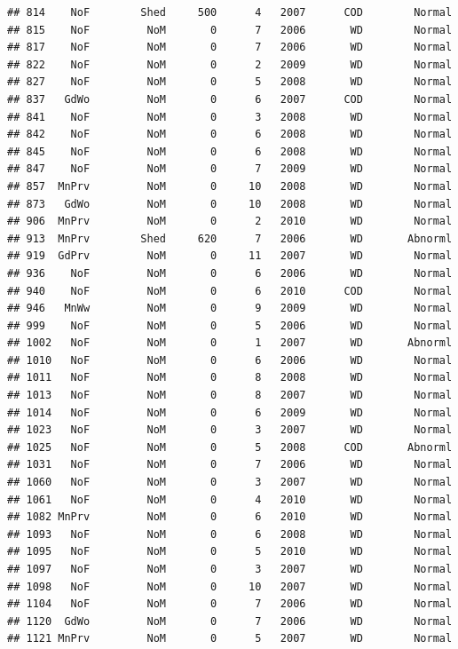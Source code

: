 \documentclass[]{article}
\begin{document}
\begin{verbatim}
## 814    NoF        Shed     500      4   2007      COD        Normal
## 815    NoF         NoM       0      7   2006       WD        Normal
## 817    NoF         NoM       0      7   2006       WD        Normal
## 822    NoF         NoM       0      2   2009       WD        Normal
## 827    NoF         NoM       0      5   2008       WD        Normal
## 837   GdWo         NoM       0      6   2007      COD        Normal
## 841    NoF         NoM       0      3   2008       WD        Normal
## 842    NoF         NoM       0      6   2008       WD        Normal
## 845    NoF         NoM       0      6   2008       WD        Normal
## 847    NoF         NoM       0      7   2009       WD        Normal
## 857  MnPrv         NoM       0     10   2008       WD        Normal
## 873   GdWo         NoM       0     10   2008       WD        Normal
## 906  MnPrv         NoM       0      2   2010       WD        Normal
## 913  MnPrv        Shed     620      7   2006       WD       Abnorml
## 919  GdPrv         NoM       0     11   2007       WD        Normal
## 936    NoF         NoM       0      6   2006       WD        Normal
## 940    NoF         NoM       0      6   2010      COD        Normal
## 946   MnWw         NoM       0      9   2009       WD        Normal
## 999    NoF         NoM       0      5   2006       WD        Normal
## 1002   NoF         NoM       0      1   2007       WD       Abnorml
## 1010   NoF         NoM       0      6   2006       WD        Normal
## 1011   NoF         NoM       0      8   2008       WD        Normal
## 1013   NoF         NoM       0      8   2007       WD        Normal
## 1014   NoF         NoM       0      6   2009       WD        Normal
## 1023   NoF         NoM       0      3   2007       WD        Normal
## 1025   NoF         NoM       0      5   2008      COD       Abnorml
## 1031   NoF         NoM       0      7   2006       WD        Normal
## 1060   NoF         NoM       0      3   2007       WD        Normal
## 1061   NoF         NoM       0      4   2010       WD        Normal
## 1082 MnPrv         NoM       0      6   2010       WD        Normal
## 1093   NoF         NoM       0      6   2008       WD        Normal
## 1095   NoF         NoM       0      5   2010       WD        Normal
## 1097   NoF         NoM       0      3   2007       WD        Normal
## 1098   NoF         NoM       0     10   2007       WD        Normal
## 1104   NoF         NoM       0      7   2006       WD        Normal
## 1120  GdWo         NoM       0      7   2006       WD        Normal
## 1121 MnPrv         NoM       0      5   2007       WD        Normal

\end{verbatim}
\end{document}
